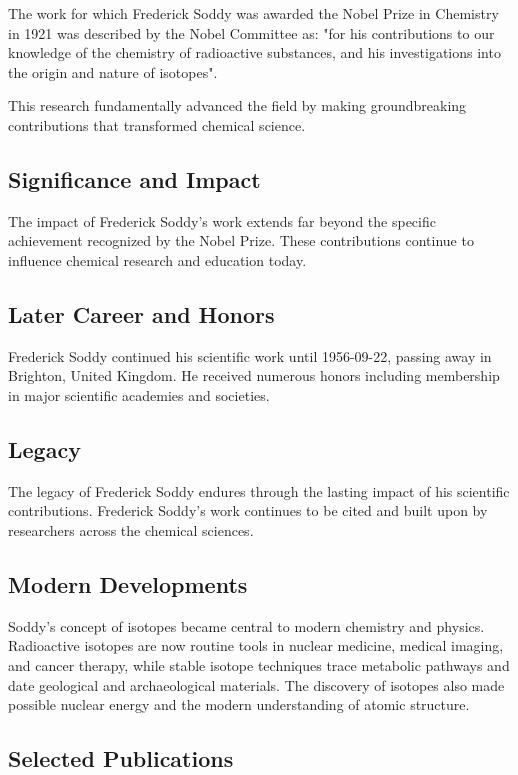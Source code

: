 The work for which Frederick Soddy was awarded the Nobel Prize in Chemistry in 1921 was described by the Nobel Committee as: "for his contributions to our knowledge of the chemistry of radioactive substances, and his investigations into the origin and nature of isotopes".

This research fundamentally advanced the field by making groundbreaking contributions that transformed chemical science.

\subsection*{Significance and Impact}

The impact of Frederick Soddy's work extends far beyond the specific achievement recognized by the Nobel Prize.
These contributions continue to influence chemical research and education today.

\subsection*{Later Career and Honors}

Frederick Soddy continued his scientific work until 1956-09-22, passing away in Brighton, United Kingdom.
He received numerous honors including membership in major scientific academies and societies.

\subsection*{Legacy}

The legacy of Frederick Soddy endures through the lasting impact of his scientific contributions.
Frederick Soddy's work continues to be cited and built upon by researchers across the chemical sciences.

\subsection*{Modern Developments}

Soddy's concept of isotopes became central to modern chemistry and physics. Radioactive isotopes are now routine tools in nuclear medicine, medical imaging, and cancer therapy, while stable isotope techniques trace metabolic pathways and date geological and archaeological materials. The discovery of isotopes also made possible nuclear energy and the modern understanding of atomic structure.

\subsection*{Selected Publications}

